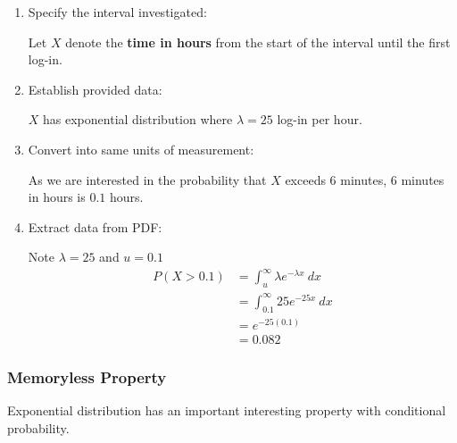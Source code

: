 \documentclass[10pt,a4paper]{article}
\begin{document}
\begin{enumerate}
    \item Specify the interval investigated: 
    
    Let $X$ denote the \textbf{time in hours} from the start of the interval until the first log-in.
    \item Establish provided data: 
    
    $X$ has exponential distribution where $\lambda = 25$ log-in per hour.
    \item Convert into same units of measurement: 
    
    As we are interested in the probability that $X$ exceeds $6$ minutes, $6$ minutes in hours is $0.1$ hours.
    \item Extract data from PDF: 
    
    Note $\lambda = 25$ and $u = 0.1$
    \begin{align*}
        P(X>0.1) &= \int_{u}^{\infty} \lambda e^{-\lambda x}\: dx \\
        &= \int_{0.1}^{\infty} 25e^{-25 x} \: dx \\
        &= e^{-25(0.1)} \\
        &= 0.082
    \end{align*}
\end{enumerate}

\subsubsection{Memoryless Property}

Exponential distribution has an important interesting property with conditional probability.
\end{document}
